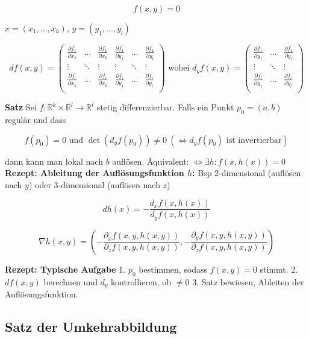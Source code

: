 \[
    f(x, y) = 0
\]

$x = (x_1, ..., x_k)$, $y = (y_1, ..., y_l)$

\[
    df(x, y) =
        \begin{pmatrix}
            \frac{\partial f_1}{\partial x_1} & \hdots & \frac{\partial f_1}{\partial x_k}
            & \frac{\partial f_1}{\partial y_1} & \hdots & \frac{\partial f_1}{\partial y_l}\\
            
            \vdots & \ddots & \vdots & \vdots & \ddots & \vdots\\
            
            \frac{\partial f_l}{\partial x_1} & \hdots & \frac{\partial f_l}{\partial x_k}
            & \frac{\partial f_l}{\partial y_1} & \hdots & \frac{\partial f_l}{\partial y_l}\\
        \end{pmatrix} \text{ wobei }
    d_yf(x, y) =
        \begin{pmatrix}
            \frac{\partial f_1}{\partial y_1} & \hdots & \frac{\partial f_1}{\partial y_l}\\
            
            \vdots & \ddots & \vdots\\
            
            \frac{\partial f_l}{\partial y_1} & \hdots & \frac{\partial f_l}{\partial y_l}\\
        \end{pmatrix}
\]

\textbf{Satz} Sei $f: \mathbb{R}^k \times \mathbb{R}^l \to \mathbb{R}^l$ stetig differenzierbar. Falls ein Punkt $p_0 = (a, b)$ regulär und dass

\[
    f(p_0) = 0 \text{ und } \det(d_y f(p_0)) \neq 0\ (\iff d_y f(p_0) \text{ ist invertierbar})
\]

dann kann man lokal nach $b$ auflösen. Äquivalent: $\iff \exists h: f(x, h(x)) = 0$\\

\textbf{Rezept: Ableitung der Auflösungsfunktion $h$:} Bsp 2-dimensional (auflösen nach $y$) oder 3-dimensional (auflösen nach $z$)

\[
    dh(x) = -\frac{d_x f(x, h(x))}{d_y f(x, h(x))}
\]


\[
    \nabla h(x, y) =
        \left(
            -\frac{\partial_x f(x, y, h(x, y))}{\partial_z f(x, y, h(x, y))},
            -\frac{\partial_y f(x, y, h(x, y))}{\partial_z f(x, y, h(x, y))}
        \right)
\]

\textbf{Rezept: Typische Aufgabe} 1. $p_0$ bestimmen, sodass $f(x, y)=0$ stimmt. 2. $df(x, y)$ berechnen und $d_y$ kontrollieren, ob $\neq 0$ 3. Satz bewiesen, Ableiten der Auflösungsfunktion.

\subsection{Satz der Umkehrabbildung}

